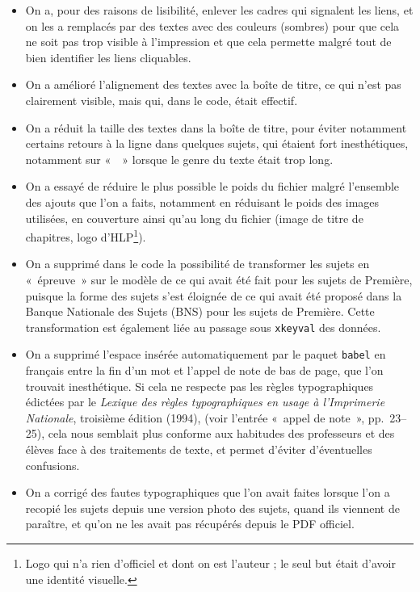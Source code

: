 \begin{itemize}
\item On a, pour des raisons de lisibilité, enlever les cadres qui signalent les liens, et on les a remplacés par des textes avec des couleurs (sombres) pour que cela ne soit pas trop visible à l'impression et que cela permette malgré tout de bien identifier les liens cliquables.
\item On a amélioré l'alignement des textes avec la boîte de titre, ce qui n'est pas clairement visible, mais qui, dans le code, était effectif.
\item On a réduit la taille des textes dans la boîte de titre, pour éviter notamment certains retours à la ligne dans quelques sujets, qui étaient fort inesthétiques, notamment sur «~\HQ~» lorsque le genre du texte était trop long.
\item On a essayé de réduire le plus possible le poids du fichier malgré l'ensemble des ajouts que l'on a faits, notamment en réduisant le poids des images utilisées, en couverture ainsi qu'au long du fichier (image de titre de chapitres, logo d'HLP\footnote{Logo qui n'a rien d'officiel et dont on est l'auteur ; le seul but était d'avoir une identité visuelle.}).
\item On a supprimé dans le code la possibilité de transformer les sujets en «~épreuve~» sur le modèle de ce qui avait été fait pour les sujets de Première, puisque la forme des sujets s'est éloignée de ce qui avait été proposé dans la Banque Nationale des Sujets (BNS) pour les sujets de Première. Cette transformation est également liée au passage sous \texttt{xkeyval} des données.
\item On a supprimé l'espace insérée automatiquement par le paquet \texttt{babel} en français entre la fin d'un mot et l'appel de note de bas de page, que l'on trouvait inesthétique. Si cela ne respecte pas les règles typographiques édictées par le \emph{Lexique des règles typographiques en usage à l’Imprimerie Nationale}, troisième édition (1994), (voir l'entrée «~appel de note~», pp.~23--25), cela nous semblait plus conforme aux habitudes des professeurs et des élèves face à des traitements de texte, et permet d'éviter d'éventuelles confusions.
\item On a corrigé des fautes typographiques que l'on avait faites lorsque l'on a recopié les sujets depuis une version photo des sujets, quand ils viennent de paraître, et qu'on ne les avait pas récupérés depuis le PDF officiel. 
\end{itemize}

